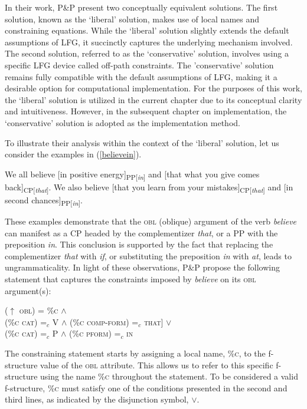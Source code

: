 In their work, P\&P present two conceptually equivalent solutions. The first solution, known as the `liberal' solution, makes use of local names and constraining equations. While the `liberal' solution slightly extends the default assumptions of LFG, it succinctly captures the underlying mechanism involved. The second solution, referred to as the `conservative' solution, involves using a specific LFG device called off-path constraints. The 'conservative' solution remains fully compatible with the default assumptions of LFG, making it a desirable option for computational implementation. For the purposes of this work, the `liberal' solution is utilized in the current chapter due to its conceptual clarity and intuitiveness. However, in the subsequent chapter on implementation, the `conservative' solution is adopted as the implementation method.

To illustrate their analysis within the context of the `liberal' solution, let us consider the examples in (\ref{believein}).

\pex
\label{believein}
\a We all believe [in positive energy]\textsubscript{PP[\textit{in}]} and [that what you give comes back]\textsubscript{CP[\textit{that}]}.
\a We also believe [that you learn from your mistakes]\textsubscript{CP[\textit{that}]} and [in second chances]\textsubscript{PP[\textit{in}]}. 
\xe

These examples demonstrate that the \textsc{obl} (oblique) argument of the verb \textit{believe} can manifest as a CP headed by the complementizer \textit{that}, or a PP with the preposition \textit{in}. This conclusion is supported by the fact that replacing the complementizer \textit{that} with \textit{if}, or substituting the preposition \textit{in} with \textit{at}, leads to ungrammaticality. In light of these observations, P\&P propose the following statement that captures the constraints imposed by \textit{believe} on its \textsc{obl} argument(s):

\ex
\label{przpat:statement}
($\uparrow$ \textsc{obl}) = \%\textsc{c} $\land$ \\
\vspace{3pt}\text{[[}(\%\textsc{c cat}) =$_c$ V $\land$ (\%\textsc{c comp-form}) =$_c$ \textsc{that}] $\lor$ \\
\text{[}(\%\textsc{c cat}) =$_c$ P $\land$ (\%\textsc{c pform}) =$_c$ \textsc{in}\text{]]}
\xe

The constraining statement starts by assigning a local name, \%\textsc{c}, to the f-structure value of the \textsc{obl} attribute. This allows us to refer to this specific f-structure using the name \%\textsc{c} throughout the statement. To be considered a valid f-structure, \%\textsc{c} must satisfy one of the conditions presented in the second and third lines, as indicated by the disjunction symbol, $\lor$.

